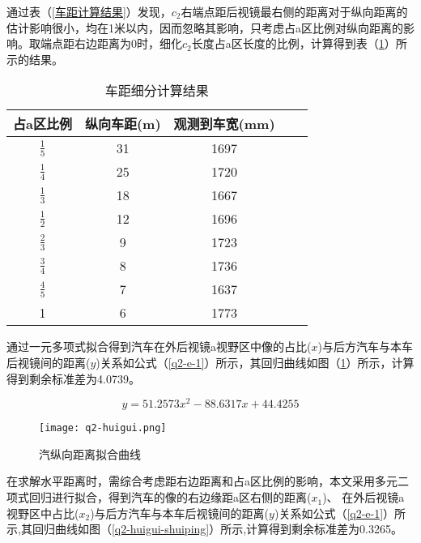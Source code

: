 \documentclass[withoutpreface,bwprint]{cumcmthesis} %
\begin{document}
\par 通过表（\ref{车距计算结果}）发现，$c_2$右端点距后视镜最右侧的距离对于纵向距离的估计影响很小，均在1米以内，因而忽略其影响，只考虑占a区比例对纵向距离的影响。取端点距右边距离为0时，细化$c_2$长度占a区长度的比例，计算得到表（\ref{车距细分计算结果}）所示的结果。
\begin{table}[!h]
\centering
\caption{车距细分计算结果}
\label{车距细分计算结果}
    \begin{tabular}{|c|c|c|c|c|}
    \hline
  	占a区比例  & 纵向车距(m)  & 观测到车宽(mm) \\ \hline	
	$\frac{1}{5}$ & 31       	& 1697  \\ \hline
	$\frac{1}{4}$ & 25       	& 1720  \\ \hline
	$\frac{1}{3}$ & 18       	& 1667 \\ \hline
	$\frac{1}{2}$ & 12      	& 1696  \\ \hline
	$\frac{2}{3}$ & 9      	& 1723  \\ \hline
	$\frac{3}{4}$ & 8      	& 1736  \\ \hline
	$\frac{4}{5}$ & 7      	& 1637 \\ \hline
	1             & 6      	& 1773  \\ \hline
    \end{tabular}
\end{table}

\par 通过一元多项式拟合得到汽车在外后视镜a视野区中像的占比($x$)与后方汽车与本车后视镜间的距离($y$)关系如公式（\ref{q2-e-1}）所示，其回归曲线如图（\ref{q2-huigui}）所示，计算得到剩余标准差为4.0739。

\begin{equation}
\label{q2-e-1}
	y = 51.2573x^2 - 88.6317x + 44.4255
\end{equation}


\begin{figure}[h]
\small
\centering
\texttt{[image: q2-huigui.png]}
\caption{汽纵向距离拟合曲线} \label{q2-huigui}
\end{figure}



\par 在求解水平距离时，需综合考虑距右边距离和占a区比例的影响，本文采用多元二项式回归进行拟合，得到汽车的像的右边缘距a区右侧的距离($x_1$)、 在外后视镜a视野区中占比($x_2$)与后方汽车与本车后视镜间的距离($y$)关系如公式（\ref{q2-e-1}）所示,其回归曲线如图（\ref{q2-huigui-shuiping}）所示,计算得到剩余标准差为0.3265。
\end{document}
